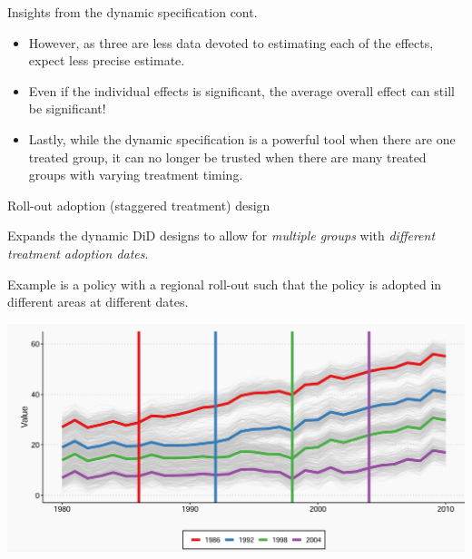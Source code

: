 \documentclass[notes,11pt, aspectratio=169]{beamer}
\newenvironment{wideitemize}{\itemize\addtolength{\itemsep}{10pt}}{\enditemize}
\begin{document}
\begin{frame}{Insights from the dynamic specification cont.} 
\begin{itemize}
\item However, as three are less data devoted to estimating each of the effects, expect less precise estimate.
\item Even if the individual effects is significant, the average overall effect can still be significant!  
\item Lastly, while the dynamic specification is a powerful tool when there are one treated group, it can no longer be trusted when there are many treated groups with varying treatment timing.
\end{itemize}
\end{frame}

\begin{frame}{Roll-out adoption (staggered treatment) design}
      \begin{wideitemize}
          \item Expands the dynamic DiD designs to allow for \textit{multiple groups} with \textit{different treatment adoption dates}. \item Example is a policy with a regional roll-out such that the policy is adopted in different areas at different dates.
\vspace{1cm}
    \begin{center}
        \includegraphics[width=0.6\linewidth]{24_DiDLecture/24_DiDLecture_StaggeredRollout.png}
    \end{center}
          
      \end{wideitemize}
\end{frame}
\end{document}
